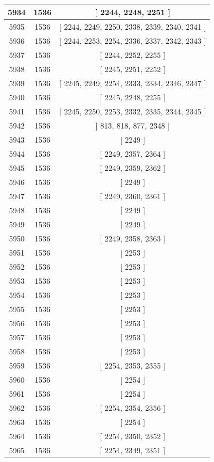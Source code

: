 \begin{center}
\begin{longtable}[H]{|| c c c ||}
\hline
5934 & 1536 & [ 2244, 2248, 2251 ] \\ 
\hline
5935 & 1536 & [ 2244, 2249, 2250, 2338, 2339, 2340, 2341 ] \\ 
\hline
5936 & 1536 & [ 2244, 2253, 2254, 2336, 2337, 2342, 2343 ] \\ 
\hline
5937 & 1536 & [ 2244, 2252, 2255 ] \\ 
\hline
5938 & 1536 & [ 2245, 2251, 2252 ] \\ 
\hline
5939 & 1536 & [ 2245, 2249, 2254, 2333, 2334, 2346, 2347 ] \\ 
\hline
5940 & 1536 & [ 2245, 2248, 2255 ] \\ 
\hline
5941 & 1536 & [ 2245, 2250, 2253, 2332, 2335, 2344, 2345 ] \\ 
\hline
5942 & 1536 & [ 813, 818, 877, 2348 ] \\ 
\hline
5943 & 1536 & [ 2249 ] \\ 
\hline
5944 & 1536 & [ 2249, 2357, 2364 ] \\ 
\hline
5945 & 1536 & [ 2249, 2359, 2362 ] \\ 
\hline
5946 & 1536 & [ 2249 ] \\ 
\hline
5947 & 1536 & [ 2249, 2360, 2361 ] \\ 
\hline
5948 & 1536 & [ 2249 ] \\ 
\hline
5949 & 1536 & [ 2249 ] \\ 
\hline
5950 & 1536 & [ 2249, 2358, 2363 ] \\ 
\hline
5951 & 1536 & [ 2253 ] \\ 
\hline
5952 & 1536 & [ 2253 ] \\ 
\hline
5953 & 1536 & [ 2253 ] \\ 
\hline
5954 & 1536 & [ 2253 ] \\ 
\hline
5955 & 1536 & [ 2253 ] \\ 
\hline
5956 & 1536 & [ 2253 ] \\ 
\hline
5957 & 1536 & [ 2253 ] \\ 
\hline
5958 & 1536 & [ 2253 ] \\ 
\hline
5959 & 1536 & [ 2254, 2353, 2355 ] \\ 
\hline
5960 & 1536 & [ 2254 ] \\ 
\hline
5961 & 1536 & [ 2254 ] \\ 
\hline
5962 & 1536 & [ 2254, 2354, 2356 ] \\ 
\hline
5963 & 1536 & [ 2254 ] \\ 
\hline
5964 & 1536 & [ 2254, 2350, 2352 ] \\ 
\hline
5965 & 1536 & [ 2254, 2349, 2351 ] \\ 

\end{longtable}
\end{center}
